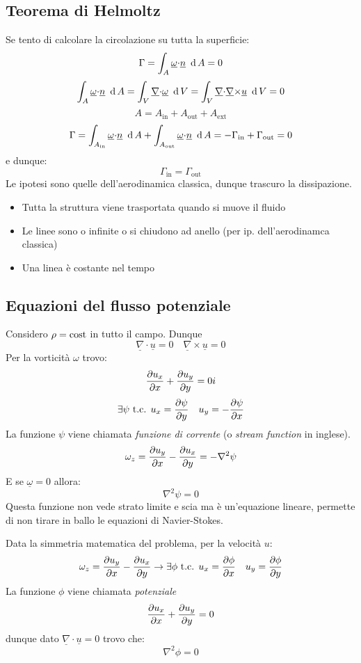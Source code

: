 \subsection{Teorema di Helmoltz}
Se tento di calcolare la circolazione su tutta la superficie:
\[
  {\Gamma}= \int_{A}^{} \underline{{\omega}}{\cdot}\underline{n} \,\,\operatorname{d} A = 0
\]
\[
  \int_{A}^{} \underline{{\omega}}{\cdot}\underline{n} \,\,\operatorname{d} A = \int_{V}^{} \underline{\nabla}{\cdot}\underline{{\omega}} \,\,\operatorname{d} V = \int_{V}^{} \underline{\nabla}{\cdot}\underline{\nabla}{\times}\underline{u} \,\,\operatorname{d} V = 0
\]
\[
  A = A _{\text{in}} + A _{\text{out}} + A _{\text{ext}}
\]
\[
  {\Gamma}= \int_{A_ \text{in}}^{} \underline{{\omega}}{\cdot}\underline{n} \,\,\operatorname{d} A+ \int_{A_ \text{out}}^{} \underline{{\omega}}{\cdot}\underline{n} \,\,\operatorname{d} A =   -{\Gamma}_{\text{in}} + {\Gamma}_{\text{out}}=0
\]
e dunque:
\[
	\boxed{{\Gamma}_{\text{in}} = {\Gamma}_{\text{out}}}
\]
Le ipotesi sono quelle dell'aerodinamica classica, dunque trascuro la dissipazione.
\begin{itemize}
  \item Tutta la struttura viene trasportata quando si muove il fluido
  \item Le linee sono o infinite o si chiudono ad anello (per ip. dell'aerodinamca classica)
  \item Una linea è costante nel tempo
\end{itemize}
\subsection{Equazioni del flusso potenziale}
Considero $ {\rho}=\operatorname{cost} $ in tutto il campo. Dunque
\[
  \underline{\nabla}{\cdot}\underline{u} = 0 \quad \underline{\nabla}{\times}\underline{u} = 0
\]
Per la vorticità $ {\omega} $ trovo:
\[
	\frac{\partial{u_x}}{\partial x} + \frac{\partial{u_y}}{\partial y}=0 i
\]
  \[
     \exists \psi \text{ t.c. } {u_x} = \frac{\partial\psi}{\partial y} \quad {u_y} = - \frac{\partial\psi}{\partial x}
  \]
La funzione $ \psi $ viene chiamata \emph{funzione di corrente} (o \emph{stream function} in inglese).
\[
  {\omega}_{z} = \frac{\partial{u_y}}{\partial x}- \frac{\partial{u_x}}{\partial y} = -{\nabla}^2\psi 
\]
E se $ \underline{{\omega}} = 0 $ allora:
\[
  {\nabla}^2\psi = 0
\]
Questa funzione non vede strato limite e scia ma è un'equazione lineare, permette di non tirare in ballo le equazioni di Navier-Stokes.

Data la simmetria matematica del problema, per la velocità $ u $:
\[
	{\omega}_{z} = \frac{\partial{u_y}}{\partial x} - \frac{\partial{u_x}}{\partial y} \rightarrow \exists {\phi} \text{ t.c. } {u_x} = \frac{\partial{\phi}}{\partial x} \quad {u_y} = \frac{\partial{\phi}}{\partial y} 
\]
La funzione $ {\phi} $ viene chiamata \emph{potenziale} 
\[
  \frac{\partial{u_x}}{\partial x}+ \frac{\partial{u_y}}{\partial y} = 0
\]
dunque dato $ \underline{\nabla}{\cdot}\underline{u} =0$ trovo che:
\[
  {\nabla}^2 {\phi} = 0
\]
